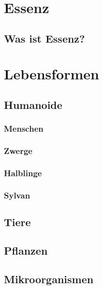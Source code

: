 \section{Essenz}
\subsection{Was ist Essenz?}

\section{Lebensformen}
\subsection{Humanoide}
\subsubsection{Menschen}
\subsubsection{Zwerge}
\subsubsection{Halblinge}
\subsubsection{Sylvan}


\subsection{Tiere}
\subsection{Pflanzen}
\subsection{Mikroorganismen}